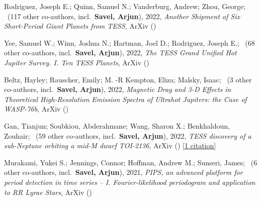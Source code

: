 \item[{\color{numcolor}\scriptsize5}] Rodriguez, Joseph E.; Quinn, Samuel N.; Vanderburg, Andrew; Zhou, George; \etal\ ({117} other co-authors, incl.\ \textbf{Savel, Arjun}), 2022, \emph{Another Shipment of Six Short-Period Giant Planets from TESS}, ArXiv ()

\item[{\color{numcolor}\scriptsize4}] Yee, Samuel W.; Winn, Joshua N.; Hartman, Joel D.; Rodriguez, Joseph E.; \etal\ ({68} other co-authors, incl.\ \textbf{Savel, Arjun}), 2022, \emph{The TESS Grand Unified Hot Jupiter Survey. I. Ten TESS Planets}, ArXiv ()

\item[{\color{numcolor}\scriptsize3}] Beltz, Hayley; Rauscher, Emily; M. -R Kempton, Eliza; Malsky, Isaac; \etal\ ({3} other co-authors, incl.\ \textbf{Savel, Arjun}), 2022, \emph{Magnetic Drag and 3-D Effects in Theoretical High-Resolution Emission Spectra of Ultrahot Jupiters: the Case of WASP-76b}, ArXiv ()

\item[{\color{numcolor}\scriptsize2}] Gan, Tianjun; Soubkiou, Abderahmane; Wang, Sharon X.; Benkhaldoun, Zouhair; \etal\ ({59} other co-authors, incl.\ \textbf{Savel, Arjun}), 2022, \emph{TESS discovery of a sub-Neptune orbiting a mid-M dwarf TOI-2136}, ArXiv () [\href{https://ui.adsabs.harvard.edu/abs/2022arXiv220210024G}{1 citation}]

\item[{\color{numcolor}\scriptsize1}] Murakami, Yukei S.; Jennings, Connor; Hoffman, Andrew M.; Sunseri, James; \etal\ ({6} other co-authors, incl.\ \textbf{Savel, Arjun}), 2021, \emph{PIPS, an advanced platform for period detection in time series -- I. Fourier-likelihood periodogram and application to RR Lyrae Stars}, ArXiv ()